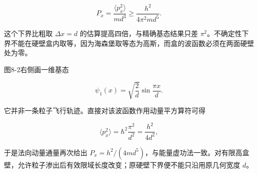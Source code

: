 \documentclass[12pt,a4paper,UTF8]{ctexart}
\begin{document}
\[
P_x=\frac{\langle p_x^2\rangle}{md^3}
\ge\frac{h^2}{4\pi^2md^5}.
\]

这个下界比粗取 \(\Delta x=d\) 的估算提高四倍，与精确基态结果只差
\(\pi^2\)。不确定性下界不能在硬壁盒内取等，因为海森堡取等态为高斯，而盒的波函数必须在两面硬壁处为零。

图8-2右侧画一维基态

\[
\psi_1(x)=\sqrt{\frac2d}\sin\frac{\pi x}{d}.
\]

它并非一条粒子飞行轨迹。直接对该波函数作用动量平方算符可得

\[
\langle p_x^2\rangle
=\hbar^2\frac{\pi^2}{d^2}
=\frac{h^2}{4d^2},
\]

于是法向动量通量再次给出
\(P_x=h^2/(4md^5)\)，与能量虚功法一致。对有限高盒壁，允许粒子渗出后有效限域长度改变；原硬壁下界便不能只沿用原几何宽度
\(d\)。
\end{document}
